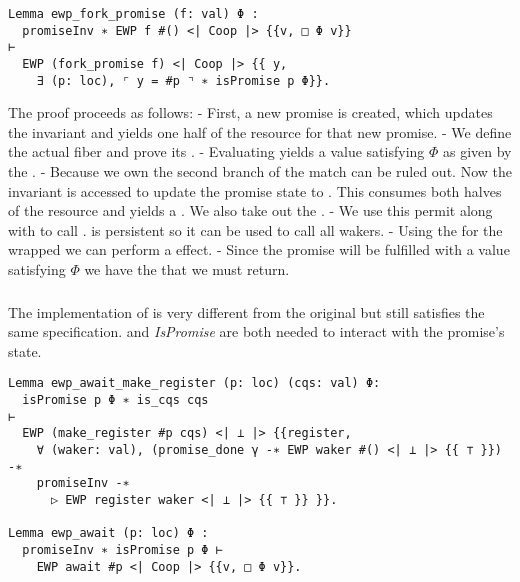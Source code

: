 \begin{verbatim}
Lemma ewp_fork_promise (f: val) Φ :
  promiseInv ∗ EWP f #() <| Coop |> {{v, □ Φ v}}
⊢ 
  EWP (fork_promise f) <| Coop |> {{ y, 
    ∃ (p: loc), ⌜ y = #p ⌝ ∗ isPromise p Φ}}.
\end{verbatim}

The proof proceeds as follows:
- First, a new promise is created, which updates the \gsPInv{} invariant and yields one half of the \gspwait{} resource for that new promise.
- We define the actual fiber and prove its \ewpt{}.
- Evaluating  yields a value satisfying \(Φ\) as given by the \ewpt{}.
- Because we own \gspwait{} the second branch of the match can be ruled out. Now the \gsPInv{} invariant is accessed to update the promise state to . This consumes both halves of the \gspwait{} resource and yields a \gspdone{}. We also take out the \gssignal{}.
- We use this permit along with \gspdone{} to call . \gspdone{} is persistent so it can be used to call all wakers.
- Using the \ewpt{} for the wrapped  we can perform a \efork{} effect.
- Since the promise will be fulfilled with a value satisfying \(Φ\) we have the  that we must return.

\subsubsection{}
\label{sec:sched-spec-await}

The implementation of  is very different from the original but still satisfies the same specification. \gsPInv{} and \textit{IsPromise} are both needed to interact with the promise's state.

\begin{verbatim}
Lemma ewp_await_make_register (p: loc) (cqs: val) Φ:
  isPromise p Φ ∗ is_cqs cqs 
⊢
  EWP (make_register #p cqs) <| ⊥ |> {{register, 
    ∀ (waker: val), (promise_done γ -∗ EWP waker #() <| ⊥ |> {{ ⊤ }}) -∗
    promiseInv -∗ 
      ▷ EWP register waker <| ⊥ |> {{ ⊤ }} }}.

Lemma ewp_await (p: loc) Φ :
  promiseInv ∗ isPromise p Φ ⊢ 
    EWP await #p <| Coop |> {{v, □ Φ v}}.
\end{verbatim}

